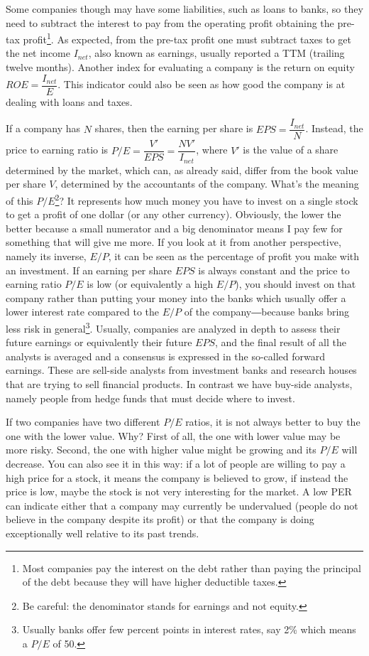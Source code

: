 Some companies though may have some liabilities, such as loans to banks, so they need to subtract the interest to pay from the operating profit obtaining the pre-tax profit\footnote{Most companies pay the interest on the debt rather than paying the principal of the debt because they will have higher deductible taxes.}. As expected, from the pre-tax profit one must subtract taxes to get the net income $I_{net}$, also known as earnings, usually reported a TTM (trailing twelve months). Another index for evaluating a company is the return on equity $ROE = \dfrac{I_{net}}{E}$. This indicator could also be seen as how good the company is at dealing with loans and taxes.

If a company has $N$ shares, then the earning per share is $EPS = \dfrac{I_{net}}{N}$. Instead, the price to earning ratio is $P/E = \dfrac{V'}{EPS} = \dfrac{NV'}{I_{net}}$, where $V'$ is the value of a share determined by the market, which can, as already said, differ from the book value per share $V$, determined by the accountants of the company. What's the meaning of this $P/E$\footnote{Be careful: the denominator stands for earnings and not equity.}? It represents how much money you have to invest on a single stock to get a profit of one dollar (or any other currency). Obviously, the lower the better because a small numerator and a big denominator means I pay few for something that will give me more. If you look at it from another perspective, namely its inverse, $E/P$, it can be seen as the percentage of profit you make with an investment. If an earning per share $EPS$ is always constant and the price to earning ratio $P/E$ is low (or equivalently a high $E/P$), you should invest on that company rather than putting your money into the banks which usually offer a lower interest rate compared to the $E/P$ of the company―because banks bring less risk in general\footnote{Usually banks offer few percent points in interest rates, say 2\% which means a $P/E$ of 50.}. Usually, companies are analyzed in depth to assess their future earnings or equivalently their future $EPS$, and the final result of all the analysts is averaged and a consensus is expressed in the so-called forward earnings. These are sell-side analysts from investment banks and research houses that are trying to sell financial products. In contrast we have buy-side analysts, namely people from hedge funds that must decide where to invest.

If two companies have two different $P/E$ ratios, it is not always better to buy the one with the lower value. Why? First of all, the one with lower value may be more risky. Second, the one with higher value might be growing and its $P/E$ will decrease. You can also see it in this way: if a lot of people are willing to pay a high price for a stock, it means the company is believed to grow, if instead the price is low, maybe the stock is not very interesting for the market. A low PER can indicate either that a company may currently be undervalued (people do not believe in the company despite its profit) or that the company is doing exceptionally well relative to its past trends.

